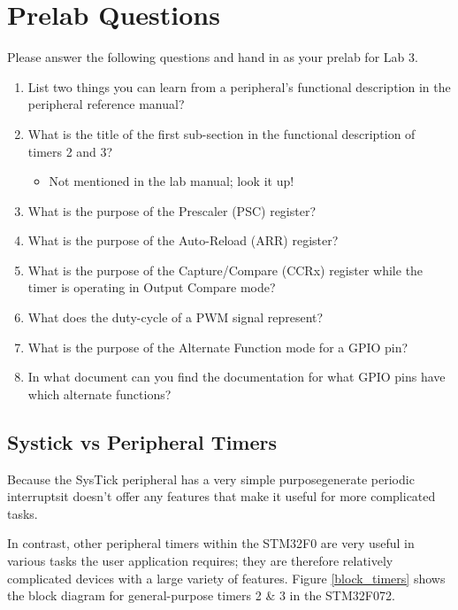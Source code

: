 \documentclass[openany,11pt,fleqn]{book} %
\begin{document}
\section{\color{blue}Prelab Questions}
\begin{question}[Prelab 3]
	Please answer the following questions and hand in as your prelab for Lab 3.
	\begin{enumerate}
		\item List two things you can learn from a peripheral's functional description in the peripheral reference manual?
		\item What is the title of the first sub-section in the functional description of timers 2 and 3?
		\begin{itemize}
			\item Not mentioned in the lab manual; look it up!
		\end{itemize}
		\item What is the purpose of the Prescaler (PSC) register?
		\item What is the purpose of the Auto-Reload (ARR) register?
		\item What is the purpose of the Capture/Compare (CCRx) register while the timer is operating in Output Compare mode? 
		\item What does the duty-cycle of a PWM signal represent?
		\item What is the purpose of the Alternate Function mode for a GPIO pin? 
		\item In what document can you find the documentation for what GPIO pins have which alternate functions?
	\end{enumerate}
\end{question}
    
    \subsection{Systick vs Peripheral Timers}
     Because the SysTick peripheral has a very simple purpose\textemdash generate periodic interrupts\textemdash it doesn't offer any features that make it useful for more complicated tasks. 
     
     In contrast, other peripheral timers within the STM32F0 are very useful in various tasks the user application requires; they are therefore relatively complicated devices with a large variety of features. Figure \ref{block_timers} shows the block diagram for general-purpose timers 2 \& 3 in the STM32F072.  
\end{document}
